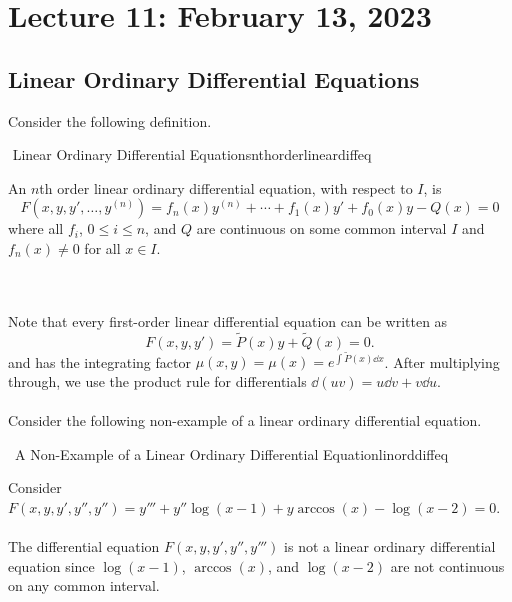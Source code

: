 \section{Lecture 11: February 13, 2023}

    \subsection{Linear Ordinary Differential Equations}

        Consider the following definition.
        \begin{definition}{\Stop\,\,Linear Ordinary Differential Equations}{nthorderlineardiffeq}

            An \(n\)th order linear ordinary differential equation, with respect to \(I\), is
            \begin{equation*}
                F(x,y,y',\ldots,y^{(n)})=f_n(x)y^{(n)}+\cdots+f_1(x)y'+f_0(x)y-Q(x)=0
            \end{equation*}
            where all \(f_i\), \(0\leq i\leq n\), and \(Q\) are continuous on some common interval \(I\) and \(f_n(x)\neq0\) for all \(x\in I\).
            
        \end{definition}
        \vphantom
        \\
        \\
        Note that every first-order linear differential equation can be written as 
        \begin{equation*}
            F(x,y,y')=\tilde{P}(x)y+\tilde{Q}(x)=0.
        \end{equation*}
        and has the integrating factor \(\mu(x,y)=\mu(x)=e^{\int \tilde{P}(x)\dd x}\). After multiplying through, we use the product rule for differentials \(\dd(uv)=u\dd v+v\dd u\).
        \\
        \\
        Consider the following non-example of a linear ordinary differential equation.
        \begin{example}{\Difficulty\,\Difficulty\,\,A Non-Example of a Linear Ordinary Differential Equation}{linorddiffeq}

            Consider \(F(x,y,y',y'',y'')=y'''+y''\log(x-1)+y\arccos(x)-\log(x-2)=0\).
            \\
            \\
            The differential equation \(F(x,y,y',y'',y''')\) is not a linear ordinary differential equation since \(\log(x-1)\), \(\arccos(x)\), and \(\log(x-2)\) are not continuous on any common interval.
            
        \end{example}
